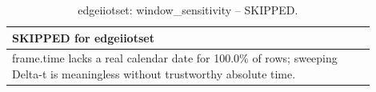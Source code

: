 \begin{table}[t]
\centering
\caption{edgeiiotset: window_sensitivity -- SKIPPED.}
\label{tab:edgeiiotset_window_sensitivity}
\begin{tabular}{p{0.9\linewidth}}
\toprule
\textbf{SKIPPED for edgeiiotset} \\
\midrule
frame.time lacks a real calendar date for 100.0\% of rows; sweeping Delta-t is meaningless without trustworthy absolute time. \\
\bottomrule
\end{tabular}
\end{table}
